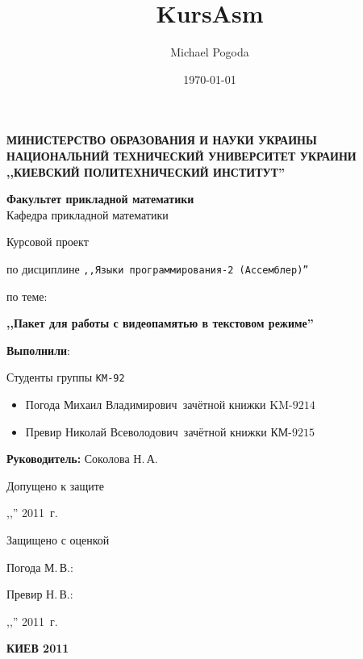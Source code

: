 \documentclass[a4paper,10pt,notitlepage,pdftex]{scrartcl}
\author{Michael Pogoda}
\title{KursAsm}
\date{\today}
\begin{document}
\thispagestyle{empty}
\begin{center}
\textbf{\Large
\MakeUppercase{Министерство образования и науки Украины}\\
\MakeUppercase{Национальний технический университет Украини}\\
\MakeUppercase{,,Киевский политехнический институт''}\\
}

\vspace{2cm}

\begin{large}
\textbf{Факультет прикладной математики}\\
Кафедра прикладной математики
\end{large}

\vspace{3cm}

\begin{large}
Курсовой проект
\end{large}

по дисциплине \texttt{,,Языки программирования-2 (Ассемблер)''}

по теме:

\textbf{,,Пакет для работы с видеопамятью в текстовом режиме''}
\end{center}

\textbf{Выполнили}:

Студенты группы \texttt{КМ-92}
\begin{itemize}
\item[ ] Погода Михаил Владимирович\hfill\textnumero~зачётной книжки KM-$9214$
\item[ ] Превир Николай Всеволодович\hfill\textnumero~зачётной книжки КМ-$9215$
\end{itemize}

\vspace{1cm}
\textbf{Руководитель:} Соколова Н.\,А.

Допущено к защите

,,\underline{\hspace{0.5cm}}'' \underline{\hspace{3cm}} 2011\, г.

\vspace{1cm}

Защищено с оценкой

Погода М.\,В.: \underline{\hspace{3cm}}

Превир Н.\,В.: \underline{\hspace{3cm}}

,,\underline{\hspace{0.5cm}}'' \underline{\hspace{3cm}} 2011\, г.


\vfill
\begin{center}

\Large
\bf
КИЕВ 2011

\end{center}
\end{document}
